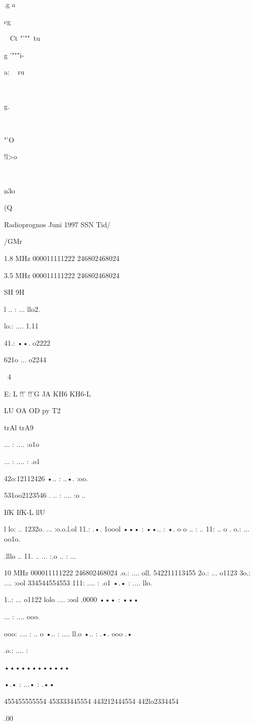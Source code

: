 \documentclass[a4paper,twoside,twocolumn,openright]{book}
\begin{document}
{{{{{{.g
a

cg

~
Ct
"'""\
tu

g
'"""i-

a:
~
ru

~

g.
~

~

"'O

!l>o

~

n3o

(Q

Radioprognos Juni 1997 SSN
Tid/

/GMr

1.8 MHz
000011111222
246802468024

3.5 MHz
000011111222
246802468024

SH
9H

l .. : ... llo2.

lo.: .... 1.11

41.: ••. o2222

621o ... o2244

~4

E: L
!!'
!!'G
JA
KH6
KH6-L

LU
OA
OD
py
T2

trAl
trA9

... : .... :o1o

... : .... : .o1

42o:12112426
•.. : ..•. :oo.

531oo2123546
. .. : .... :o ..

IfK
IfK-L
llU

l lo: .. 1232o.
... :o.o.l.ol
11.: .•. 1oool
••• : ••.. : •. o
o .. : .. 11: .. o
. o.: ... oo1o.

.lllo .. 11. ..
... :.o .. : ...

10 MHz
000011111222
246802468024
.o.: .... oll.
542211113455
2o.: ... o1123
3o.: .... :ool
334544554553
111: .... : .o1
•.• : .... llo.

1..: ... o1122
lolo .... :ool
.0000 ••• : •••

... : .... ooo.

ooo: .... : .. o
•.. : .... ll.o
•.. : .•. ooo .•

.o.: .... :

••••••••••••

•.• : ...• : .••

455455555554
453333445554
443212444554
442lo2334454

.00

}}}}}}
\end{document}
